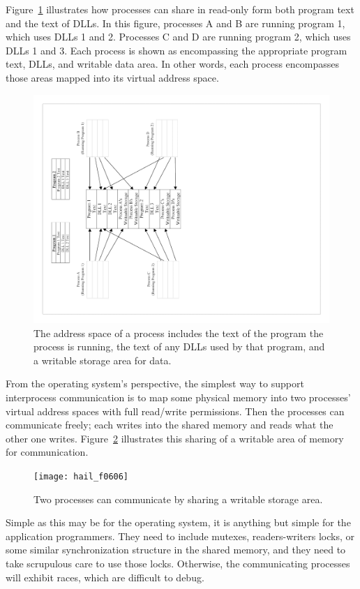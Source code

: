 Figure~\ref{scan-6-3} illustrates how processes can share in read-only
form both program text and the text of DLLs.  In this figure,
processes A and B are running program 1, which uses DLLs 1 and 2.
Processes C and D are running program 2, which uses DLLs 1 and 3.
Each process is shown as encompassing the appropriate program text,
DLLs, and writable data area.  In other words, each process encompasses
those areas mapped into its virtual address space.
\begin{figure}
\centerline{\includegraphics{hail_f0605}}
\caption{The address space of a process includes the text of the
  program the process is running, the text of any DLLs used by that
  program, and a writable storage area for data.}
\label{scan-6-3}
\end{figure}


From the operating system's perspective, the simplest way to support
interprocess communication is to map some physical memory into two
processes' virtual address spaces with full read/write permissions.
Then the processes can communicate freely; each
writes into the shared memory and reads what the other one writes.
Figure~\ref{scan-6-4} illustrates this sharing of a writable
area of memory for communication.
\begin{figure}
\centerline{\texttt{[image: hail\_f0606]}}
\caption{Two processes can communicate by sharing a writable storage area.}
\label{scan-6-4}
\end{figure}

Simple as this may be for the operating system, it is anything but
simple for the application programmers.  They need to include mutexes,
readers-writers locks, or some similar synchronization structure in
the shared memory, and they need to take scrupulous care to use those
locks.  Otherwise, the communicating processes will exhibit races,
which are difficult to debug.

